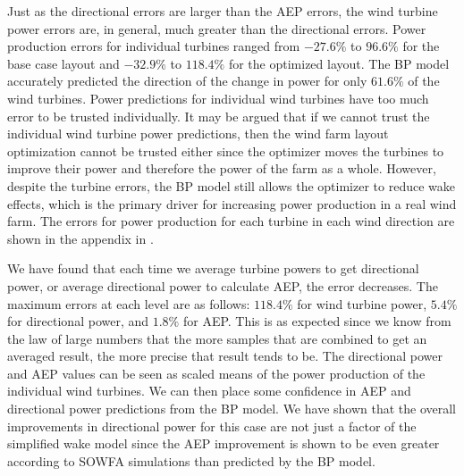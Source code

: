 \documentclass[conf]{new-aiaa}
\begin{document}
Just as the directional errors are larger than the AEP errors, the wind turbine power errors are, in general, much greater than the directional errors. Power production errors for individual turbines ranged from $-27.6\%$ to $96.6\%$ for the base case layout and $-32.9\%$ to $118.4\%$ for the optimized layout. The BP model accurately predicted the direction of the change in power for only $61.6\%$ of the wind turbines. Power predictions for individual wind turbines have too much error to be trusted individually. It may be argued that if we cannot trust the individual wind turbine power predictions, then the wind farm layout optimization cannot be trusted either since the optimizer moves the turbines to improve their power and therefore the power of the farm as a whole. However, despite the turbine errors, the BP model still allows the optimizer to reduce wake effects, which is the primary driver for increasing power production in a real wind farm. The errors for power production for each turbine in each wind direction are shown in the appendix in .

We have found that each time we average turbine powers to get directional power, or average directional power to calculate AEP, the error decreases. The maximum errors at each level are as follows: $118.4\%$ for wind turbine power, $5.4\%$ for directional power, and $1.8\%$ for AEP. This is as expected since we know from the law of large numbers that the more samples that are combined to get an averaged result, the more precise that result tends to be. The directional power and AEP values can be seen as scaled means of the power production of the individual wind turbines. We can then place some confidence in AEP and directional power predictions from the BP model. We have shown that the overall improvements in directional power for this case are not just a factor of the simplified wake model since the AEP improvement is shown to be even greater according to SOWFA simulations than predicted by the BP model.
\end{document}

